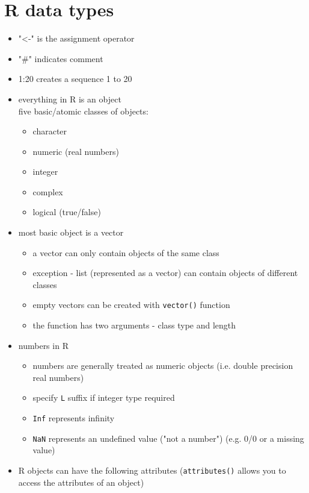\documentclass[11pt,fancy]{elegantbook}
\begin{document}
\section{R data types}
\begin{itemize}
    \item "<-" is the assignment operator
    \item "\#" indicates comment
    \item 1:20 creates a sequence 1 to 20
    \item everything in R is an object\\ five basic/atomic classes of objects:
          \begin{itemize}
              \item character
              \item numeric (real numbers)
              \item integer
              \item complex
              \item logical (true/false)
          \end{itemize}
    \item most basic object is a vector
          \begin{itemize}
              \item a vector can only contain objects of the same class
              \item exception - list (represented as a vector) can contain objects of different classes
              \item empty vectors can be created with \texttt{vector()} function
              \item the function has two arguments - class type and length
          \end{itemize}
    \item numbers in R
          \begin{itemize}
              \item numbers are generally treated as numeric objects (i.e. double precision real numbers)
              \item specify \texttt{L} suffix if integer type required
              \item \texttt{Inf} represents infinity
              \item \texttt{NaN} represents an undefined value ("not a number") (e.g. 0/0 or a missing value)
          \end{itemize}
    \item R objects can have the following attributes (\texttt{attributes()} allows you to access the attributes of an object)

\end{itemize}
\end{document}
